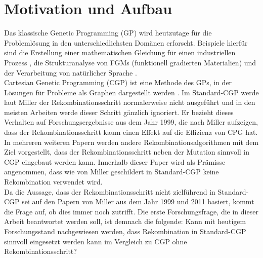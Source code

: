 \chapter{Motivation und Aufbau}
\label{Motivation und Aufbau}

Das klassische Genetic Programming (GP) wird heutzutage für die Problemlösung in den unterschiedlichsten Domänen erforscht.
Beispiele hierfür sind die Erstellung einer mathematischen Gleichung für einen industriellen Prozess \cite{sette_genetic_2001}, die Strukturanalyse von FGMs (funktionell gradierten Materialien) \cite{demirbas_stress_2022} und der Verarbeitung von natürlicher Sprache \cite{araujo_genetic_2020}.\\

Cartesian Genetic Programming (CGP) ist eine Methode des GPs, in der Lösungen für Probleme als Graphen dargestellt werden \cite{miller_cartesian_2020}. 
Im Standard-CGP werde laut Miller der Rekombinationsschritt normalerweise nicht ausgeführt und in den meisten Arbeiten werde dieser Schritt gänzlich ignoriert. 
Er bezieht dieses Verhalten auf Forschungsergebnisse aus dem Jahr 1999, die nach Miller aufzeigen, dass der Rekombinationsschritt kaum einen Effekt auf die Effizienz von CPG hat. \cite{miller_cartesian_2020} 
In mehreren weiteren Papern werden andere Rekombinationsalgorithmen mit dem Ziel vorgestellt, dass der Rekombinationsschritt neben der Mutation sinnvoll in CGP eingebaut werden kann. 
Innerhalb dieser Paper wird als Prämisse angenommen, dass wie von Miller geschildert in Standard-CGP keine Rekombination verwendet wird. \cite{clegg_new_2007,kalkreuth_comprehensive_2020, torabi_using_2022}\\
Da die Aussage, dass der Rekombinationsschritt nicht zielführend in Standard-CGP sei auf den Papern von Miller aus dem Jahr 1999 und 2011 basiert, kommt die Frage auf, ob dies immer noch zutrifft.
Die erste Forschungsfrage, die in dieser Arbeit beantwortet werden soll, ist demnach die folgende: \glqq Kann mit heutigem Forschungsstand nachgewiesen werden, dass Rekombination in Standard-CGP sinnvoll eingesetzt werden kann im Vergleich zu CGP ohne Rekombinationsschritt?\grqq\\

